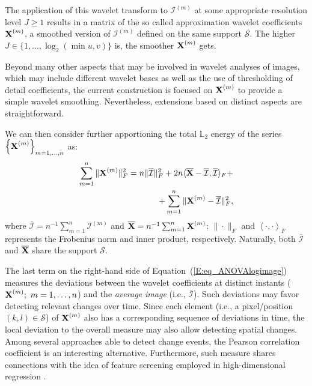 \documentclass[journal]{IEEEtran}
\newcommand{\vX}{{\textbf X}}
\begin{document}
The application of this wavelet transform to $\mathcal{I}^{(m)}$ at some appropriate resolution level $J\geq 1$ results in a matrix of the so called approximation wavelet coefficients $\vX^{(m)}$, a smoothed version of $\mathcal{I}^{(m)}$ 
defined on the same support $\mathcal{S}$. The higher $J\in\{1,\ldots,\log_2( \min{u,v} )\}$ is, the smoother $\vX^{(m)}$ gets.

Beyond many other aspects that may be involved in wavelet analyses of images, which may include different wavelet bases as well as the use of thresholding of detail coefficients, the current construction is focused on $\vX^{(m)}$ to provide a simple wavelet smoothing. Nevertheless, extensions based on distinct aspects are straightforward.

We can then consider further apportioning the total $\mathbb{L}_2$ energy of the series $\left\{\vX^{(m)}\right\}_{m=1,\ldots,n}$ as:
\begin{equation}\label{E:eq_ANOVAlogimage}
\begin{split}
\sum_{m=1}^n\|\vX^{(m)}\|_F^2
= n\|\overline{\mathcal{I}}\|_F^2 + 2n\langle\overline{\vX}-\overline{\mathcal{I}},\overline{\mathcal{I}}\rangle_F + \\
+ \sum_{m=1}^n\|\mathcal \vX^{(m)} - \overline{\mathcal{I}}\|_F^2,
\end{split}
\end{equation}
where $\overline{\mathcal{I}}=n^{-1}\sum_{m=1}^n\mathcal{I}^{(m)}$ and $\overline{\vX}=n^{-1}\sum_{m=1}^n\vX^{(m)}$; $\| \cdot \|_F$ and $\left\langle \cdot , \cdot \right\rangle_F$ represents the Frobenius norm and inner product, respectively. Naturally, both $\overline{\mathcal{I}}$ and $\overline{\vX}$ share the support $\mathcal{S}$.


The last term on the right-hand side of Equation~(\ref{E:eq_ANOVAlogimage}) measures the deviations between the wavelet coefficients at distinct instants ($\vX^{(m)}; \ m=1,\ldots,n$) and the \textit{average image} (i.e., $\overline{\mathcal{I}}$). Such deviations may favor detecting relevant changes over time. Since each element (i.e., a pixel/position $(k,l)\in \mathcal{S}$) of $\vX^{(m)}$ also has a corresponding sequence of deviations in time, the local deviation to the overall measure may also allow detecting spatial changes. Among several approaches able to detect change events, the Pearson correlation coefficient is an interesting alternative. Furthermore, such measure shares connections with the idea of feature screening employed in high-dimensional regression \cite{fan2008sure}.
\end{document}
